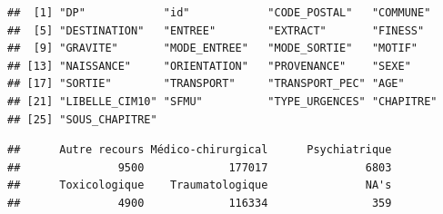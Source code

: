 \documentclass[]{article}
\newenvironment{Shaded}{\begin{snugshade}}{\end{snugshade}}
\newcommand{\KeywordTok}[1]{\textcolor[rgb]{0.13,0.29,0.53}{\textbf{{#1}}}}
\newcommand{\CommentTok}[1]{\textcolor[rgb]{0.56,0.35,0.01}{\textit{{#1}}}}
\newcommand{\NormalTok}[1]{{#1}}
\begin{document}
\begin{verbatim}
##  [1] "DP"            "id"            "CODE_POSTAL"   "COMMUNE"      
##  [5] "DESTINATION"   "ENTREE"        "EXTRACT"       "FINESS"       
##  [9] "GRAVITE"       "MODE_ENTREE"   "MODE_SORTIE"   "MOTIF"        
## [13] "NAISSANCE"     "ORIENTATION"   "PROVENANCE"    "SEXE"         
## [17] "SORTIE"        "TRANSPORT"     "TRANSPORT_PEC" "AGE"          
## [21] "LIBELLE_CIM10" "SFMU"          "TYPE_URGENCES" "CHAPITRE"     
## [25] "SOUS_CHAPITRE"
\end{verbatim}

\begin{Shaded}
\end{Shaded}

\begin{verbatim}
##      Autre recours Médico-chirurgical      Psychiatrique 
##               9500             177017               6803 
##      Toxicologique    Traumatologique               NA's 
##               4900             116334                359
\end{verbatim}

\begin{Shaded}
\end{Shaded}
\end{document}
